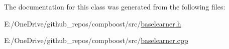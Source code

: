 The documentation for this class was generated from the following files\+:\begin{DoxyCompactItemize}
\item 
E\+:/\+One\+Drive/github\+\_\+repos/compboost/src/\mbox{\hyperlink{baselearner_8h}{baselearner.\+h}}\item 
E\+:/\+One\+Drive/github\+\_\+repos/compboost/src/\mbox{\hyperlink{baselearner_8cpp}{baselearner.\+cpp}}\end{DoxyCompactItemize}
